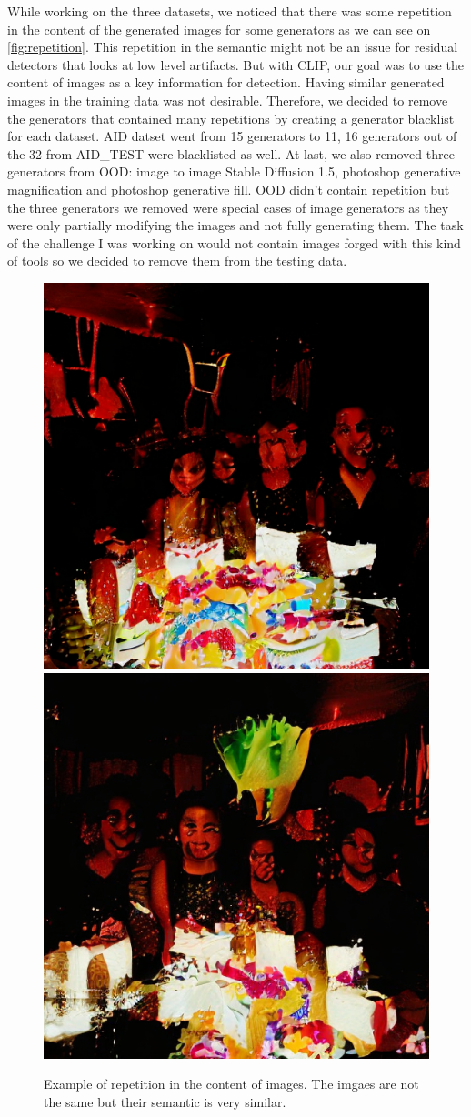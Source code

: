 \documentclass[12pt,a4paper]{article}
\begin{document}
While working on the three datasets, we noticed that there was some repetition in the content of the generated images for some generators as we can see on \autoref{fig:repetition}. This repetition in the semantic might not be an issue for residual detectors that looks at low level artifacts. But with CLIP, our goal was to use the content of images as a key information for detection. Having similar generated images in the training data was not desirable. Therefore, we decided to remove the generators that contained many repetitions by creating a generator blacklist for each dataset. AID datset went from 15 generators to 11, 16 generators out of the 32 from AID\_TEST were blacklisted as well. At last, we also removed three generators from OOD: image to image Stable Diffusion 1.5, photoshop generative magnification and photoshop generative fill. OOD didn't contain repetition but the three generators we removed were special cases of image generators as they were only partially modifying the images and not fully generating them. The task of the challenge I was working on would not contain images forged with this kind of tools so we decided to remove them from the testing data.

\begin{figure}[H]
    \centering
    \includegraphics[width=.49\textwidth]{img/birthday1.png}
    \includegraphics[width=.49\textwidth]{img/birthday2.png}
    \caption{Example of repetition in the content of images. The imgaes are not the same but their semantic is very similar.}
    \label{fig:repetition}
\end{figure}
\end{document}
